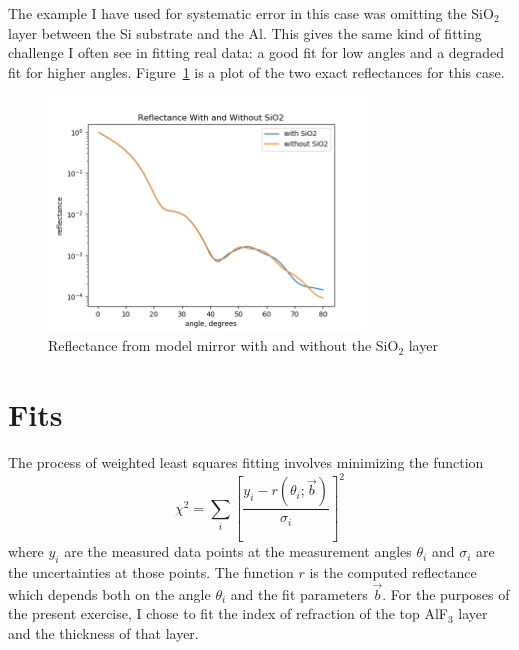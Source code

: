 \documentclass[english]{scrartcl}
\begin{document}
The example I have used for systematic error in this case was omitting the
SiO$_2$ layer between the Si substrate and the Al. This gives the same
kind of fitting challenge I often see in fitting real data: a good fit
for low angles and a degraded fit for higher angles.
Figure~\ref{fig:with-and-without} is a plot of the two exact reflectances
for this case.
\begin{figure}[htb]
	\begin{center}
		\includegraphics[width=0.75\textwidth]{images/with-and-without}
	\end{center}
	\caption{\label{fig:with-and-without}Reflectance from model mirror with and
		without the SiO$_2$ layer}
\end{figure}

\section{Fits}
The process of weighted least squares fitting involves minimizing
the function
\begin{equation}
\chi^2 = \sum_i\left[\frac{y_i - r(\theta_i;
	\vec{b})}{\sigma_i}\right]^2\label{eq:chisq}
\end{equation}
where $y_i$ are the measured data points at the measurement angles
$\theta_i$ and $\sigma_i$ are the uncertainties at those points. The
function $r$ is the computed reflectance which depends both on the angle
$\theta_i$ and the fit parameters $\vec{b}$. For the purposes of
the present exercise, I chose to fit the index of refraction of
the top AlF$_3$ layer and the thickness of that layer.
\end{document}
